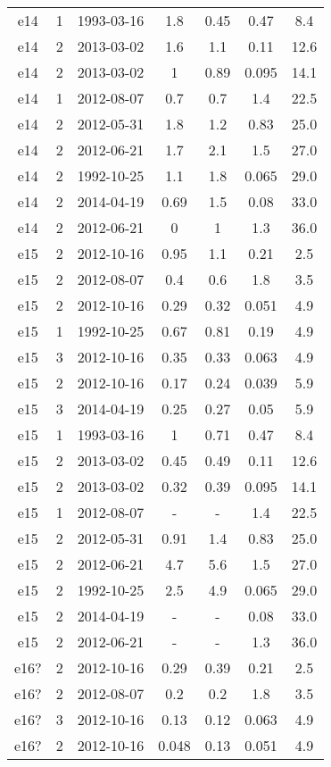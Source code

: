 \begin{table*}[htp]
\begin{tabular}{ccccccc}
e14 & 1 & 1993-03-16 & 1.8 & 0.45 & 0.47 & 8.4 \\
e14 & 2 & 2013-03-02 & 1.6 & 1.1 & 0.11 & 12.6 \\
e14 & 2 & 2013-03-02 & 1 & 0.89 & 0.095 & 14.1 \\
e14 & 1 & 2012-08-07 & 0.7 & 0.7 & 1.4 & 22.5 \\
e14 & 2 & 2012-05-31 & 1.8 & 1.2 & 0.83 & 25.0 \\
e14 & 2 & 2012-06-21 & 1.7 & 2.1 & 1.5 & 27.0 \\
e14 & 2 & 1992-10-25 & 1.1 & 1.8 & 0.065 & 29.0 \\
e14 & 2 & 2014-04-19 & 0.69 & 1.5 & 0.08 & 33.0 \\
e14 & 2 & 2012-06-21 & 0 & 1 & 1.3 & 36.0 \\
e15 & 2 & 2012-10-16 & 0.95 & 1.1 & 0.21 & 2.5 \\
e15 & 2 & 2012-08-07 & 0.4 & 0.6 & 1.8 & 3.5 \\
e15 & 2 & 2012-10-16 & 0.29 & 0.32 & 0.051 & 4.9 \\
e15 & 1 & 1992-10-25 & 0.67 & 0.81 & 0.19 & 4.9 \\
e15 & 3 & 2012-10-16 & 0.35 & 0.33 & 0.063 & 4.9 \\
e15 & 2 & 2012-10-16 & 0.17 & 0.24 & 0.039 & 5.9 \\
e15 & 3 & 2014-04-19 & 0.25 & 0.27 & 0.05 & 5.9 \\
e15 & 1 & 1993-03-16 & 1 & 0.71 & 0.47 & 8.4 \\
e15 & 2 & 2013-03-02 & 0.45 & 0.49 & 0.11 & 12.6 \\
e15 & 2 & 2013-03-02 & 0.32 & 0.39 & 0.095 & 14.1 \\
e15 & 1 & 2012-08-07 & - & - & 1.4 & 22.5 \\
e15 & 2 & 2012-05-31 & 0.91 & 1.4 & 0.83 & 25.0 \\
e15 & 2 & 2012-06-21 & 4.7 & 5.6 & 1.5 & 27.0 \\
e15 & 2 & 1992-10-25 & 2.5 & 4.9 & 0.065 & 29.0 \\
e15 & 2 & 2014-04-19 & - & - & 0.08 & 33.0 \\
e15 & 2 & 2012-06-21 & - & - & 1.3 & 36.0 \\
e16? & 2 & 2012-10-16 & 0.29 & 0.39 & 0.21 & 2.5 \\
e16? & 2 & 2012-08-07 & 0.2 & 0.2 & 1.8 & 3.5 \\
e16? & 3 & 2012-10-16 & 0.13 & 0.12 & 0.063 & 4.9 \\
e16? & 2 & 2012-10-16 & 0.048 & 0.13 & 0.051 & 4.9 \\

\end{tabular}
\end{table*}
